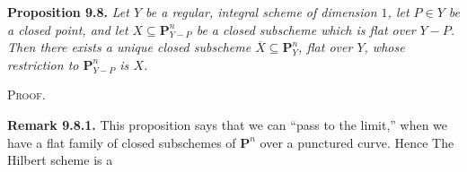 {\smallskip
\noindent\hypertarget{result-III-9.8}{}\textbf{Proposition 9.8.} \emph{Let $Y$ be a regular, integral scheme of dimension $1$, let $P\in Y$ be a closed point, and let $X\subseteq\mathbf P^n_{Y-P}$ be a closed subscheme which is flat over $Y-P$. Then there exists a unique closed subscheme $\overline X\subseteq\mathbf P^n_Y$, flat over $Y$, whose restriction to $\mathbf P^n_{Y-P}$ is $X$.}

\smallskip
\noindent\textsc{Proof.} 

\smallskip
\noindent\hypertarget{result-III-9.8.1}{}\textbf{Remark 9.8.1.} This proposition says that we can \textquotedblleft{}pass to the limit,\textquotedblright{} when we have a flat family of closed subschemes of $\mathbf P^n$ over a punctured curve. Hence  The Hilbert scheme is a}
